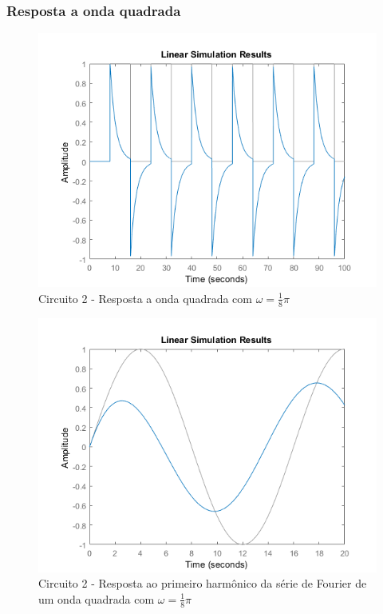 \documentclass[a4paper, 12pt]{article}
\begin{document}
			\subsubsection{Resposta a onda quadrada}
			\begin{figure}[!ht]
				\centering
				\includegraphics[scale=0.71]{img/1i_circ2.png}
				\caption{Circuito 2 - Resposta a onda quadrada com $\omega = \frac{1}{8}\pi$}
			\end{figure}
			\begin{figure}[!ht]
				\centering
				\includegraphics[scale=0.71]{img/1j_circ2.png}
				\caption{Circuito 2 - Resposta ao primeiro harmônico da série de Fourier de um onda quadrada com $\omega = \frac{1}{8}\pi$}
			\end{figure}
\end{document}
